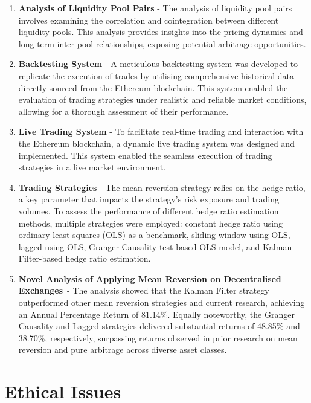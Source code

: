 \begin{enumerate}[wide, labelwidth=!, labelindent=2ex]
    \itemsep-0.1em
    \item \textbf{Analysis of Liquidity Pool Pairs} - The analysis of liquidity pool pairs involves examining the correlation and cointegration between different liquidity pools. This analysis provides insights into the pricing dynamics and long-term inter-pool relationships, exposing potential arbitrage opportunities. 
    \item \textbf{Backtesting System} - A meticulous backtesting system was developed to replicate the execution of trades by utilising comprehensive historical data directly sourced from the Ethereum blockchain. This system enabled the evaluation of trading strategies under realistic and reliable market conditions, allowing for a thorough assessment of their performance.
    \item \textbf{Live Trading System} - To facilitate real-time trading and interaction with the Ethereum blockchain, a dynamic live trading system was designed and implemented. This system enabled the seamless execution of trading strategies in a live market environment.
    \item \textbf{Trading Strategies} - The mean reversion strategy relies on the hedge ratio, a key parameter that impacts the strategy's risk exposure and trading volumes. To assess the performance of different hedge ratio estimation methods, multiple strategies were employed: constant hedge ratio using ordinary least squares (OLS) as a benchmark, sliding window using OLS, lagged using OLS, Granger Causality test-based OLS model, and Kalman Filter-based hedge ratio estimation.
    \item \textbf{Novel Analysis of Applying Mean Reversion on Decentralised Exchanges}~- The analysis showed that the Kalman Filter strategy outperformed other mean reversion strategies and current research, achieving an Annual Percentage Return of 81.14\%. Equally noteworthy, the Granger Causality and Lagged strategies delivered substantial returns of 48.85\% and 38.70\%, respectively, surpassing returns observed in prior research on mean reversion and pure arbitrage across diverse asset classes.
\end{enumerate}

\section{Ethical Issues}

